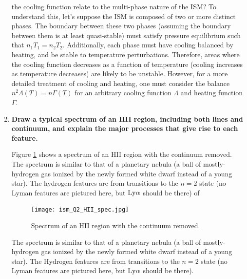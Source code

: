 \begin{enumerate}
       the cooling function relate to the multi-phase nature of the ISM?
      To understand this, let's suppose the ISM is composed of two or more distinct phases.
      The boundary between these two phases (assuming the boundary between them is at least
      quasi-stable) must satisfy pressure equilibrium such that $n_1T_1=n_2T_2$.  Additionally,
      each phase must have cooling balanced by heating, and be stable to temperature
      perturbations.
      Therefore, areas where the cooling function decreases as a function of temperature
      (cooling increases as temperature decreases) are likely to be unstable.  However, for a more
      detailed treatment of cooling and heating, one must consider the balance $n^2\Lambda(T) = n\Gamma(T)$
      for an arbitrary cooling function $\Lambda$ and heating function $\Gamma$.
      
\item \textbf{Draw a typical spectrum of an HII region, including both lines and continuum, and
      explain the major processes that give rise to each feature.}
      
      Figure \ref{f:HIIspec} shows a spectrum of an HII region with the continuum removed. The spectrum is similar to that of a planetary nebula (a ball of mostly-hydrogen gas ionized by the newly formed white dwarf instead of a young star). The hydrogen features are from transitions to the $n=2$ state (no Lyman features are pictured here, but ${\rm Ly}\alpha$ should be there) of 
      
      \begin{figure}[ht]
      \begin{center}
      \texttt{[image: ism\_Q2\_HII\_spec.jpg]}
      \end{center}
      \caption{Spectrum of an HII region with the continuum removed. \label{f:HIIspec}}
	\end{figure}
	
	 The spectrum is similar to that of a planetary nebula (a ball of mostly-hydrogen gas ionized by the newly formed white dwarf instead of a young star). The Hydrogen features are from transitions to the $n=2$ state (no Lyman features are pictured here, but ${\rm Ly}\alpha$ should be there). 
	 

\end{enumerate}
